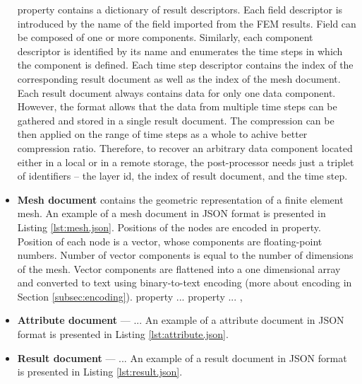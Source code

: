 \begin{itemize}
     property contains a dictionary of result descriptors. Each field descriptor is introduced by the name of the field imported from the FEM results. Field can be composed of one or more components. Similarly, each component descriptor is identified by its name and enumerates the time steps in which the component is defined. Each time step descriptor contains the index of the corresponding result document as well as the index of the mesh document. Each result document always contains data for only one data component. However, the format allows that the data from multiple time steps can be gathered and stored in a single result document. The compression can be then applied on the range of time steps as a whole to achive better compression ratio. Therefore, to recover an arbitrary data component located either in a local or in a remote storage, the post-processor needs just a triplet of identifiers -- the layer id, the index of result document, and the time step.

    \item \textbf{Mesh document} contains the geometric representation of a finite element mesh. An example of a mesh document in JSON format is presented in Listing \ref{lst:mesh.json}. Positions of the nodes are encoded in  property. Position of each node is a vector, whose components are floating-point numbers. Number of vector components is equal to the number of dimensions of the mesh. Vector components are flattened into a one dimensional array and converted to text using binary-to-text encoding (more about encoding in Section \ref{subsec:encoding}).  property ...  property ... , 

    \item \textbf{Attribute document} --- ... An example of a attribute document in JSON format is presented in Listing \ref{lst:attribute.json}.

    \item \textbf{Result document} --- ... An example of a result document in JSON format is presented in Listing \ref{lst:result.json}.

\end{itemize}


